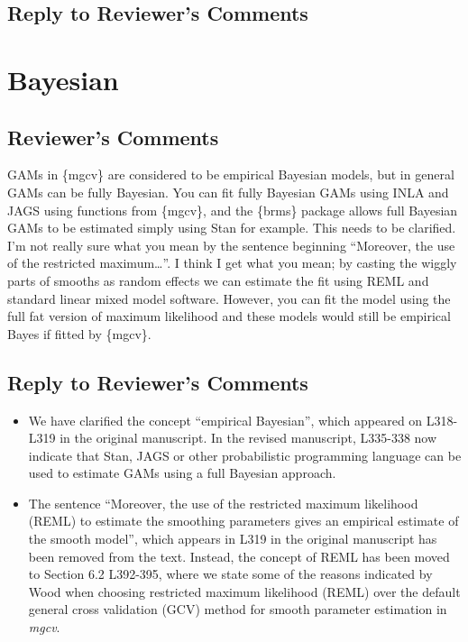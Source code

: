 \documentclass[
]{article}
\begin{document}
\hypertarget{section-6}{%
\subsection{\texorpdfstring{\textcolor{reviewersblue} {Reply to Reviewer's Comments}}{}}\label{section-6}}

\hypertarget{bayesian}{%
\section{Bayesian}\label{bayesian}}

\hypertarget{reviewers-comments-6}{%
\subsection{Reviewer's Comments}\label{reviewers-comments-6}}

GAMs in \{mgcv\} are considered to be empirical Bayesian models, but in general GAMs can be fully Bayesian. You can fit fully Bayesian GAMs using INLA and JAGS using functions from \{mgcv\}, and the \{brms\} package allows full Bayesian GAMs to be estimated simply using Stan for example. This needs to be clarified.
I'm not really sure what you mean by the sentence beginning ``Moreover, the use of the restricted maximum\ldots{}''. I think I get what you mean; by casting the wiggly parts of smooths as random effects we can estimate the fit using REML
and standard linear mixed model software. However, you can fit the model using the full fat version of maximum likelihood and these models would still be empirical Bayes if fitted by \{mgcv\}.

\hypertarget{section-7}{%
\subsection{\texorpdfstring{\textcolor{reviewersblue} {Reply to Reviewer's Comments}}{}}\label{section-7}}

\begin{itemize}
\item
  We have clarified the concept ``empirical Bayesian'', which appeared on L318-L319 in the original manuscript. In the revised manuscript, L335-338 now indicate that Stan, JAGS or other probabilistic programming language can be used to estimate GAMs using a full Bayesian approach.
\item
  The sentence ``Moreover, the use of the restricted maximum likelihood (REML) to estimate the smoothing parameters gives an empirical estimate of the smooth model'', which appears in L319 in the original manuscript has been removed from the text. Instead, the concept of REML has been moved to Section 6.2 L392-395, where we state some of the reasons indicated by Wood when choosing restricted maximum likelihood (REML) over the default general cross validation (GCV) method for smooth parameter estimation in \emph{mgcv}.
\end{itemize}
\end{document}
